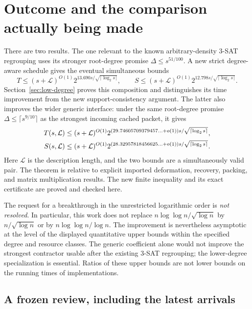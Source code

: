 \section{Outcome and the comparison actually being made}
\label{sec:review}

There are two results. The one relevant to the known arbitrary-density
3-SAT regrouping uses its stronger root-degree promise
$\Delta\le s^{51/100}$. A new strict degree-aware schedule gives the
eventual simultaneous bounds
\[
 T\le(s+\mathcal L)^{O(1)}2^{13.690s/\sqrt{\lceil\log_2s\rceil}},\qquad
 S\le(s+\mathcal L)^{O(1)}2^{12.798s/\sqrt{\lceil\log_2s\rceil}}.
\]
Section~\ref{sec:low-degree} proves this composition and distinguishes its
time improvement from the new support-consistency argument. The latter
also improves the wider generic interface: under the same root-degree
promise $\Delta\le\lceil s^{9/10}\rceil$ as the strongest incoming cached
packet, it gives
\begin{equation}\label{eq:main-bound}
 \begin{aligned}
 T(s,\mathcal L)&\le (s+\mathcal L)^{O(1)}
 2^{(29.74605709379457\ldots+o(1))s/\sqrt{\lceil\log_2s\rceil}},\\
 S(s,\mathcal L)&\le (s+\mathcal L)^{O(1)}
 2^{(28.32957818456625\ldots+o(1))s/\sqrt{\lceil\log_2s\rceil}}.
 \end{aligned}
\end{equation}
Here $\mathcal L$ is the description length, and the two bounds are a
simultaneously valid pair. The theorem is relative to explicit imported
deformation, recovery, packing, and matrix multiplication results. The new
finite inequality and its exact certificate are proved and checked here.

The request for a breakthrough in the unrestricted logarithmic order is
\emph{not resolved}. In particular, this work does not replace
$n\log\log n/\sqrt{\log n}$ by $n/\sqrt{\log n}$ or by
$n\log\log n/\log n$. The improvement is nevertheless asymptotic at the
level of the displayed quantitative upper bounds within the specified
degree and resource classes. The generic coefficient alone would not
improve the strongest contractor usable after the existing 3-SAT regrouping;
the lower-degree specialization is essential. Ratios of these upper bounds are not lower bounds on
the running times of implementations.

\subsection{A frozen review, including the latest arrivals}

